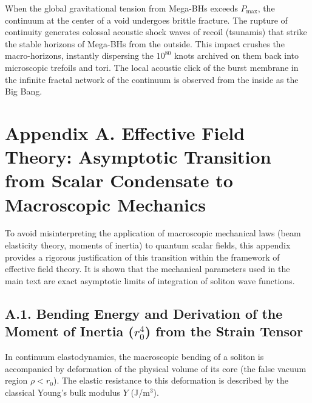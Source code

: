 \documentclass[11pt,a4paper]{article}
\begin{document}
When the global gravitational tension from Mega-BHs exceeds $P_{\text{max}}$, the continuum at the center of a void undergoes brittle fracture. The rupture of continuity generates colossal acoustic shock waves of recoil (tsunamis) that strike the stable horizons of Mega-BHs from the outside. This impact crushes the macro-horizons, instantly dispersing the $10^{80}$ knots archived on them back into microscopic trefoils and tori. The local acoustic click of the burst membrane in the infinite fractal network of the continuum is observed from the inside as the Big Bang.

\section*{Appendix A. Effective Field Theory: Asymptotic Transition from Scalar Condensate to Macroscopic Mechanics}
To avoid misinterpreting the application of macroscopic mechanical laws (beam elasticity theory, moments of inertia) to quantum scalar fields, this appendix provides a rigorous justification of this transition within the framework of effective field theory. It is shown that the mechanical parameters used in the main text are exact asymptotic limits of integration of soliton wave functions.

\subsection*{A.1. Bending Energy and Derivation of the Moment of Inertia ($r_0^4$) from the Strain Tensor}
In continuum elastodynamics, the macroscopic bending of a soliton is accompanied by deformation of the physical volume of its core (the false vacuum region $\rho < r_0$). The elastic resistance to this deformation is described by the classical Young's bulk modulus $Y$ (J/m$^3$).
\end{document}
